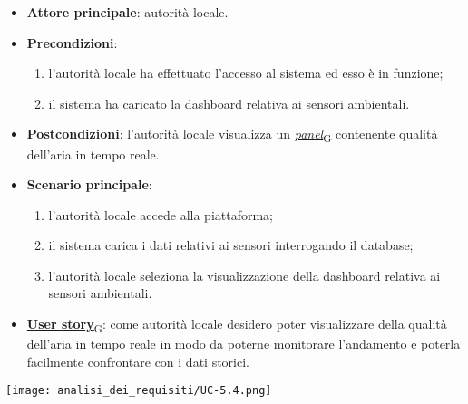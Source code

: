 \begin{itemize}
	\item \textbf{Attore principale}: autorità locale.
	\item \textbf{Precondizioni}:
	      \begin{enumerate}
		      \item l'autorità locale ha effettuato l'accesso al sistema ed esso è in funzione;
		      \item il sistema ha caricato la dashboard relativa ai sensori ambientali.
	      \end{enumerate}
	\item \textbf{Postcondizioni}: l'autorità locale visualizza un \href{https://7last.github.io/docs/pb/documentazione-interna/glossario\#panel}{\textit{panel}\textsubscript{G}} contenente qualità dell'aria in tempo reale.
	\item \textbf{Scenario principale}:
	      \begin{enumerate}
		      \item l'autorità locale accede alla piattaforma;
		      \item il sistema carica i dati relativi ai sensori interrogando il database;
		      \item l'autorità locale seleziona la visualizzazione della dashboard relativa ai sensori ambientali.
	      \end{enumerate}
	\item \href{https://7last.github.io/docs/pb/documentazione-interna/glossario\#user-story}{\textbf{User story}\textsubscript{G}}:
	      come autorità locale desidero poter visualizzare della qualità dell'aria in tempo reale in modo da poterne monitorare l'andamento
	      e poterla facilmente confrontare con i dati storici.
\end{itemize}
\begin{center}
	\texttt{[image: analisi\_dei\_requisiti/UC-5.4.png]}
\end{center}

